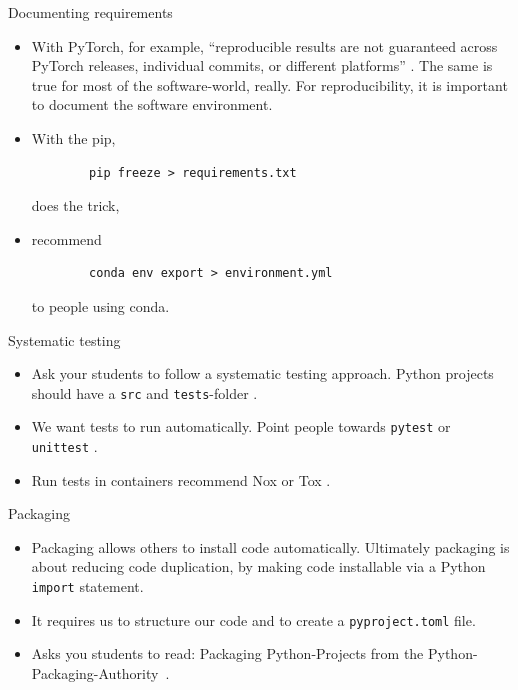 \documentclass{beamer}
\begin{document}
    \begin{frame}[fragile]{Documenting requirements}
    \begin{itemize}
      \item With PyTorch, for example, \enquote{reproducible results are not guaranteed across PyTorch releases, individual commits, or different platforms} \cite{PyTorch2024randomness}.
    The same is true for most of the software-world, really.
    For reproducibility, it is important to document the software environment.
    
      \item With the \acf{pip},
    \begin{verbatim}
        pip freeze > requirements.txt
    \end{verbatim}
      does the trick,
    \item recommend
    \begin{verbatim}
        conda env export > environment.yml
    \end{verbatim}
    to people using conda.
    \end{itemize}
    \end{frame}


    \begin{frame}{Systematic testing}
      \begin{itemize}
        \item Ask your students to follow a systematic testing approach.
      Python projects should have a \texttt{src} and \texttt{tests}-folder \cite{packaging2025python}.
        \item We want tests to run automatically. Point people towards \texttt{pytest}
      \cite{pytest2025docs} or \texttt{unittest} \cite{unittest2025pythondocs}.
        \item Run tests in containers recommend Nox \cite{nox2025docs} or 
      Tox \cite{tox2025docs}.
     \end{itemize}
    \end{frame}

    \begin{frame}{Packaging}
      \begin{itemize}
        \item Packaging allows others to install code automatically.
      Ultimately packaging is about reducing code duplication, by
      making code installable via a Python \texttt{import} statement.
        \item It requires us to structure our code and to create a \texttt{pyproject.toml} file.
        \item Asks you students to read: Packaging Python-Projects
      from the Python-Packaging-Authority~\cite{packaging2025python}.
    \end{itemize}
    \end{frame}
\end{document}
